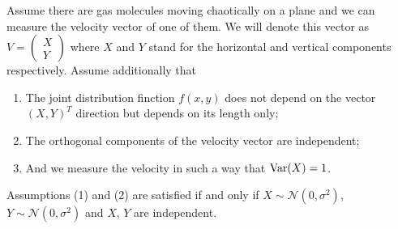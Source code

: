Assume there are gas molecules moving chaotically on a plane
and we can measure the velocity vector of one of them.
We will denote this vector as $V = \begin{pmatrix} X \\ Y \end{pmatrix}$
where $X$ and $Y$ stand for the horizontal and vertical components respectively.
Assume additionally that
\begin{enumerate}
  \item The joint distribution finction $f(x,y)$ does not depend on
  the vector $(X,Y)^T$ direction but depends on its length only;
  \item The orthogonal components of the velocity vector are independent;
  \item And we measure the velocity in such a way that $\operatorname{Var}(X) = 1$.
\end{enumerate}


\begin{theorem}
Assumptions (1) and (2) are satisfied if and only if
$X \sim \mathcal{N}(0, \sigma^2)$, $Y \sim \mathcal{N}(0, \sigma^2)$
and $X$, $Y$ are independent.
\end{theorem}

